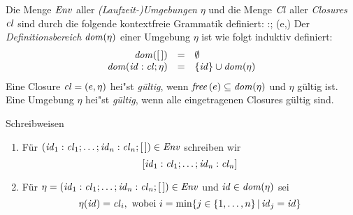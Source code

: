 \documentclass[12pt,fleqn]{article}
\newcommand{\Cl}{\name{Cl}}
\newcommand{\cl}{\name{cl}}
\begin{document}
\begin{definition}
  Die Menge ${\text{\it Env\/}}$ aller {\em (Laufzeit-)Umgebungen} $\eta$ und die Menge $\Cl$ aller {\em Closures} $\cl$ sind
  durch die folgende kontextfreie Grammatik definiert:
  \bgram
  \eta \is [\,] \mid \id:\cl;\eta \n
  \cl \is (e,\eta)
  \egram
  Der {\em Definitionsbereich} ${\text{\it dom\/}}(\eta)$ einer Umgebung $\eta$ ist wie folgt induktiv definiert:
  \[\begin{array}{rcl}
    \dom{[\,]} &=& \emptyset \\
    \dom{\id:\cl;\eta} &=& \{\id\} \cup \dom{\eta}
  \end{array}\]
  Eine Closure $\cl = (e,\eta)$ hei"st {\em g\"ultig}, wenn ${\text{\it free\/}}\,(e) \subseteq {\text{\it dom\/}}(\eta)$ und
  $\eta$ g\"ultig ist. Eine Umgebung $\eta$ hei"st {\em g\"ultig}, wenn alle eingetragenen
  Closures g\"ultig sind.
\end{definition}

\noindent Schreibweisen
\begin{enumerate}
\item F\"ur $(\id_1:\cl_1;\ldots;\id_n:\cl_n;[\,])\in\Env$ schreiben wir
  \[
  [\id_1:\cl_1;\ldots;\id_n:\cl_n]
  \]
\item F\"ur $\eta=(\id_1:\cl_1;\ldots;\id_n:\cl_n;[\,])\in\Env$ und ${\text{\it id\/}}\in{\text{\it dom\/}}(\eta)$ sei
  \[
  \eta(\id) = \cl_i, \text{ wobei } i = \min\{j \in \{1,\ldots,n\}\,|\,\id_j=\id\}
  \]
\end{enumerate}
\end{document}
